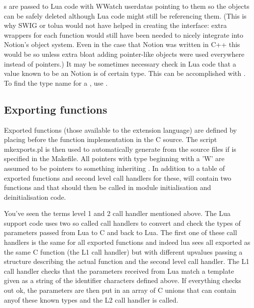 s are passed to Lua code with WWatch userdatas pointing to
them so the objects can be safely deleted although Lua code might still be
referencing them. (This is why SWIG or tolua would not have helped in
creating the interface: extra wrappers for each function would still
have been needed to nicely integrate into Notion's object system. Even in
the case that Notion was written in C++ this would be so unless extra bloat
adding pointer-like objects were used everywhere instead of pointers.)
It may be sometimes necessary check in Lua code that a value known to
be an Notion  is of certain type. This can be accomplished with
. To find the type name for a ,
use .

\subsection{Exporting functions}
\label{sec:exporting}

Exported functions (those available to the extension language) are
defined by placing  before the function implementation
in the C source. The script mkexports.pl is then used to automatically
generate  from the source files if
is specified in the Makefile. All pointers with type beginning with a 'W'
are assumed to be pointers to something inheriting . In
addition to a table of exported functions and second level call handlers
for these,  will contain two functions
 and
 that should then be called in module
initialisation and deinitialisation code.

You've seen the terms level 1 and 2 call handler mentioned above. 
The Lua support code uses two so called call handlers to convert and check
the types of parameters passed from Lua to C and back to Lua. The first
one of these call handlers is the same for all exported functions and
indeed lua sees all exported as the same C function (the L1 call handler)
but with different upvalues passing a structure describing the actual
function and the second level call handler. The L1 call handler checks
that the parameters received from Lua match a template given as a string
of the identifier characters defined above. If everything checks out ok,
the parameters are then put in an array of C unions that can contain
anyof these known types and the L2 call handler is called.

